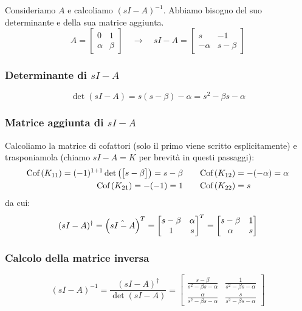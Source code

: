 \begin{esem}
Consideriamo $A$ e calcoliamo $(sI-A)^{-1}$. Abbiamo bisogno del suo determinante e della sua matrice aggiunta.
\begin{equation*}
A = \begin{bmatrix}
0 & 1 \\ \alpha & \beta 
\end{bmatrix} \quad\longrightarrow \quad sI-A = \begin{bmatrix}
s & -1 \\ -\alpha & s- \beta
\end{bmatrix}
\end{equation*}

\subsubsection{Determinante di $sI-A$}
\begin{equation*}
\det(sI-A) = s(s-\beta) -\alpha = s^2 - \beta s -\alpha
\end{equation*}
\subsubsection{Matrice aggiunta di $sI-A$}
Calcoliamo la matrice di cofattori (solo il primo viene scritto esplicitamente) e trasponiamola (chiamo $sI-A = K$ per brevità in questi passaggi):
\begin{align*}
\textrm{Cof}\left( K_{11} \right) = (-1)^{1+1} \det\left( \begin{bmatrix}
s-\beta
\end{bmatrix} \right) = s-\beta \quad & \quad
\textrm{Cof}\left( K_{12} \right) = -(-\alpha) = \alpha \\
\textrm{Cof}\left( K_{21} \right) = -(-1) = 1 \quad & \quad \textrm{Cof}\left( K_{22} \right) = s
\end{align*}
da cui:
\begin{equation*}
(sI-A)^\dag = \left( \hat{sI-A} \right)^T = \begin{bmatrix}
s-\beta & \alpha \\ 1 & s
\end{bmatrix}^T = \begin{bmatrix}
s-\beta & 1 \\
\alpha & s
\end{bmatrix}
\end{equation*}
\subsubsection{Calcolo della matrice inversa}
\begin{equation*}
(sI-A)^{-1} = \frac{(sI-A)^\dag}{\det(sI-A)} = \begin{bmatrix}
\displaystyle\frac{s-\beta}{s^2-\beta s -\alpha} & \displaystyle\frac{1}{s^2-\beta s -\alpha} \\[0.4cm] 
\displaystyle\frac{\alpha}{s^2-\beta s -\alpha} & \displaystyle\frac{s}{s^2-\beta s -\alpha}
\end{bmatrix}
\end{equation*}
\end{esem}
\newpage
